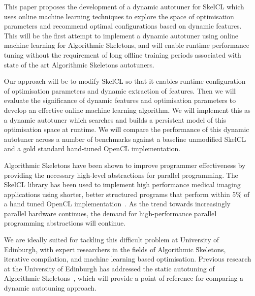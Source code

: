 This paper proposes the development of a dynamic autotuner for SkelCL
which uses online machine learning techniques to explore the space of
optimisation parameters and recommend optimal configurations based on
dynamic features. This will be the first attempt to implement a
dynamic autotuner using online machine learning for Algorithmic
Skeletons, and will enable runtime performance tuning without the
requirement of long offline training periods associated with state of
the art Algorithmic Skeletons autotuners.

Our approach will be to modify SkelCL so that it enables runtime
configuration of optimisation parameters and dynamic extraction of
features. Then we will evaluate the significance of dynamic features
and optimisation parameters to develop an effective online machine
learning algorithm. We will implement this as a dynamic autotuner
which searches and builds a persistent model of this optimisation
space at runtime. We will compare the performance of this dynamic
autotuner across a number of benchmarks against a baseline unmodified
SkelCL and a gold standard hand-tuned OpenCL implementation.

Algorithmic Skeletons have been shown to improve programmer
effectiveness by providing the necessary high-level abstractions for
parallel programming. The SkelCL library has been used to implement
high performance medical imaging applications using shorter, better
structured programs that perform within 5\% of a hand tuned OpenCL
implementation~\cite{Steuwer2012}. As the trend towards increasingly
parallel hardware continues, the demand for high-performance parallel
programming abstractions will continue.

We are ideally suited for tackling this difficult problem at
University of Edinburgh, with expert researchers in the fields of
Algorithmic Skeletons, iterative compilation, and machine learning
based optimisation. Previous research at the University of Edinburgh
has addressed the static autotuning of Algorithmic
Skeletons~\cite{Collins2012, Collins2013}, which will provide a point
of reference for comparing a dynamic autotuning approach.
